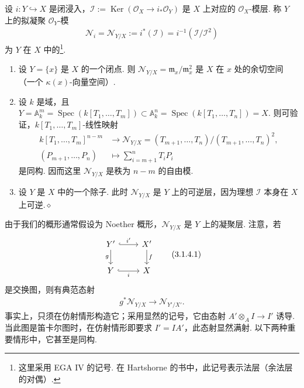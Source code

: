 \begin{definition}\label{item:ag-3-1-2}
设 $i:Y\hookrightarrow X$ 是闭浸入，$\mathcal I:=\operatorname{Ker}(\mathcal O_X\longrightarrow i_*\mathcal O_Y)$ 是 $X$ 上对应的 $\mathcal O_X$-模层. 称 $Y$ 上的拟凝聚 $\mathcal O_Y$-模
\begin{align*}
\mathcal N_i=\mathcal N_{Y/X}:=i^*(\mathcal I)=i^{-1}(\mathcal I/\mathcal I^2)
\end{align*}
为 $Y$ 在 $X$ 中的\footnote{这里采用 EGA IV 的记号. 在 Hartshorne 的书中，此记号表示法层（余法层的对偶）.}.
\end{definition}
\begin{example}\label{item:ag-3-1-3}
\begin{enumerate}[label=(\roman*)]
\item 设 $Y=\{x\}$ 是 $X$ 的一个闭点. 则 $\mathcal N_{Y/X}=\mathfrak m_x/\mathfrak m_x^2$ 是 $X$ 在 $x$ 处的余切空间（一个 $\kappa(x)$-向量空间）.
\item 设 $k$ 是域，且 $Y=\mathbb A_k^m=\operatorname{Spec}(k[T_1,\ldots,T_m])\subset\mathbb A_k^n=\operatorname{Spec}(k[T_1,\ldots,T_n])=X$. 则可验证，$k[T_1,\ldots,T_m]$-线性映射
\begin{align*}
k[T_1,\ldots,T_m]^{n-m}&\longrightarrow\mathcal N_{Y/X}=(T_{m+1},\ldots,T_n)/(T_{m+1},\ldots,T_n)^2,\\
(P_{m+1},\ldots,P_n)&\longmapsto\sum_{i=m+1}^nT_iP_i
\end{align*}
是同构. 因而这里 $\mathcal N_{Y/X}$ 是秩为 $n-m$ 的自由模.
\item 设 $Y$ 是 $X$ 中的一个除子. 此时 $\mathcal N_{Y/X}$ 是 $Y$ 上的可逆层，因为理想 $\mathcal I$ 本身在 $X$ 上可逆.\unskip\nobreak\hfill\ensuremath{\diamond}
\end{enumerate}
\renewcommand{\envenddiamond}{}
\end{example}
\begin{numpara}[余法层的函子性]\label{item:ag-3-1-4}
由于我们的概形通常假设为 Noether 概形，$\mathcal N_{Y/X}$ 是 $Y$ 上的凝聚层. 注意，若
\begin{align}
\begin{tikzcd}[ampersand replacement=\&]
Y'\arrow[r,hook,"i'"]\arrow[d,"g"'] \& X'\arrow[d,"f"]\\
Y\arrow[r,hook,"i"'] \& X
\end{tikzcd}\tag{3.1.4.1}\label{eq:ag-3-1-4-1}
\end{align}
是交换图，则有典范态射
\begin{align}
g^*\mathcal N_{Y/X}\longrightarrow\mathcal N_{Y'/X'}.\tag{3.1.4.2}\label{eq:ag-3-1-4-2}
\end{align}
事实上，只须在仿射情形构造它；采用显然的记号，它由态射 $A'\otimes_AI\longrightarrow I'$ 诱导. 当此图是笛卡尔图时，在仿射情形即要求 $I'=IA'$，此态射显然满射. 以下两种重要情形中，它甚至是同构.
\end{numpara}
